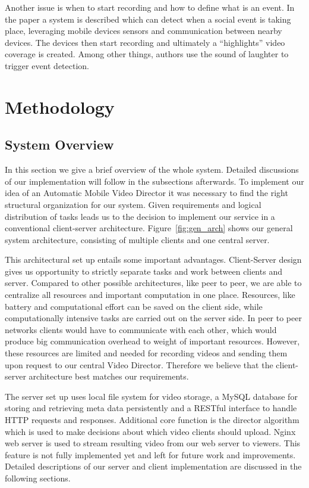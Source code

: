 \documentclass[conference]{IEEEtran}
\begin{document}
Another issue is when to start recording and how to define what is an event.
In the paper \cite{bao_movi:_2010} a system is described which can detect when a social event is taking place, leveraging
mobile devices sensors and communication between nearby devices.
The devices then start recording and ultimately a ``highlights'' video coverage is created.
Among other things, authors use the sound of laughter to trigger event detection.

\section{Methodology}

\subsection{System Overview}
In this section we give a brief overview of the whole system.
Detailed discussions of our implementation will follow in the subsections afterwards. 
To implement our idea of an Automatic Mobile Video Director it was necessary to find the right structural organization for our system.
Given requirements and logical distribution of tasks leads us to the decision 
to implement our service in a conventional client-server architecture.
Figure~\ref{fig:gen_arch} shows our general system architecture, consisting of multiple clients and one central server.

This architectural set up entails some important advantages.
Client-Server design gives us opportunity to strictly separate tasks and work between clients and server.
Compared to other possible architectures, like peer to peer, we are able to centralize all resources
and important computation in one place. 
Resources, like battery and computational effort can be saved on the client side, 
while computationally intensive tasks are carried out on the server side. 
In peer to peer networks clients would have to communicate with each other, 
which would produce big communication overhead to weight of important resources.
However, these resources are limited and needed for recording videos and sending them upon request to our central Video Director.
Therefore we believe that the client-server architecture best matches our requirements.

The server set up uses local file system for video storage, a MySQL database for storing and retrieving meta data persistently and a RESTful interface to handle HTTP requests and responses.
Additional core function is the director algorithm which is used to make decisions about which video clients should upload.
Nginx web server is used to stream resulting video from our web server to viewers.
This feature is not fully implemented yet and left for future work and improvements.
Detailed descriptions of our server and client implementation are discussed in the following sections.
\end{document}
